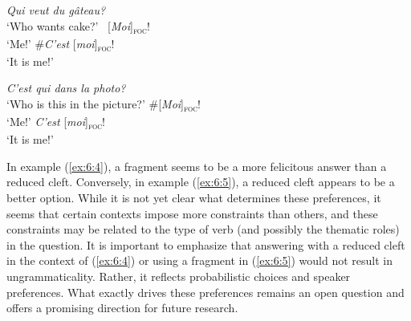   
\ea \label{ex:6:4}
\ea \textit{Qui veut du gâteau?}\\
 ‘Who wants cake?'
 \ [\textit{Moi}]\textsubscript{\textsc{foc}}\normalsize!\\
‘Me!'
 \#\textit{C'est} [\textit{moi}]\textsubscript{\textsc{foc}}\normalsize!\\
‘It is me!'
\z \z 

\ea \label{ex:6:5}
\ea \textit{C'est qui dans la photo?}\\
 ‘Who is this in the picture?'
 \#[\textit{Moi}]\textsubscript{\textsc{foc}}\normalsize!\\
‘Me!'
  \textit{C'est} [\textit{moi}]\textsubscript{\textsc{foc}}\normalsize!\\
‘It is me!'
\z \z

In example (\ref{ex:6:4}), a fragment seems to be a more felicitous answer than a reduced cleft. Conversely, in example (\ref{ex:6:5}), a reduced cleft appears to be a better option. While it is not yet clear what determines these preferences, it seems that certain contexts impose more constraints than others, and these constraints may be related to the type of verb (and possibly the thematic roles) in the question.
It is important to emphasize that answering with a reduced cleft in the context of (\ref{ex:6:4}) or using a fragment in (\ref{ex:6:5}) would not result in ungrammaticality. Rather, it reflects probabilistic choices and speaker preferences. What exactly drives these preferences remains an open question and offers a promising direction for future research.




